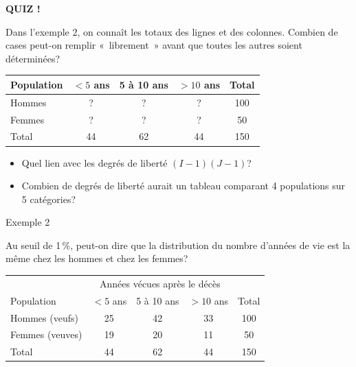 \documentclass{BeamerTemplate}
\begin{document}
\begin{frame}[plain,t]
  \centerline{\LARGE\bfseries\alert{QUIZ !}}

  \medskip
  Dans l'exemple 2, on connaît les totaux des lignes et des colonnes. Combien de
  cases peut-on remplir «~librement~» avant que toutes les autres soient
  déterminées?

  \smallskip
  \begin{center}
  \renewcommand{\arraystretch}{1.3}
  \begin{tabular}{l|ccc|c}
  Population & $<5$ ans & 5 à 10 ans & $>10$ ans & Total\\
  \hline
  Hommes & ? & ? & ? & 100\\
  Femmes & ? & ? & ? & 50\\
  \hline
  Total & 44 & 62 & 44 & 150\\
  \end{tabular}
  \end{center}

  \begin{itemize}\itemsep 1.2cm
    \item<2-> Quel lien avec les degrés de liberté $(I-1)(J-1)$?
    \item<3-> Combien de degrés de liberté aurait un tableau comparant
    4 populations sur 5 catégories?
  \end{itemize}
\end{frame}

\begin{frame}[t]{Exemple 2}

Au seuil de 1\,\%, peut-on dire que la distribution du nombre d'années de vie
est la même chez les hommes et chez les femmes?

\bigskip
\begin{center}
\renewcommand{\arraystretch}{1.3}
\begin{tabular}{l|ccc|c}
 & \multicolumn{3}{c|}{Années vécues après le décès} & \\
Population & $<5$ ans & 5 à 10 ans & $>10$ ans & Total\\
\hline
Hommes (veufs) & 25 & 42 & 33 & 100\\
Femmes (veuves) & 19 & 20 & 11 & 50\\
\hline
Total & 44 & 62 & 44 & 150\\
\end{tabular}
\end{center}

\end{frame}
\end{document}
